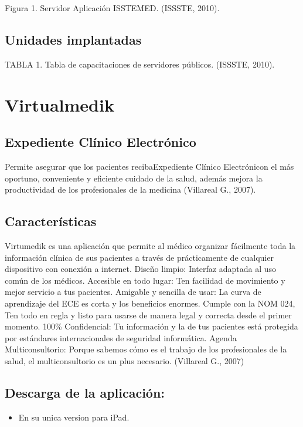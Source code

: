                              Figura 1. Servidor Aplicación ISSTEMED. (ISSSTE, 2010).




 \subsection{Unidades implantadas}

TABLA 1. Tabla de capacitaciones de servidores públicos. (ISSSTE, 2010).



\section{Virtualmedik}

\subsection{Expediente Clínico Electrónico}
Permite asegurar que los pacientes recibaExpediente Clínico Electrónicon el más oportuno, conveniente y eficiente cuidado de la salud, además mejora la productividad de los profesionales de la medicina (Villareal G., 2007).

\subsection{Características}
Virtumedik es una aplicación que permite al médico organizar fácilmente toda la información clínica de sus pacientes a través de prácticamente de cualquier dispositivo con conexión a internet.
Diseño limpio: Interfaz adaptada al uso común de los médicos.
Accesible en todo lugar: Ten facilidad de movimiento y mejor servicio a tus pacientes.
Amigable y sencilla de usar: La curva de aprendizaje del ECE es corta y los beneficios enormes.
Cumple con la NOM 024, Ten todo en regla y listo para usarse de manera legal y correcta desde el primer momento.
100\% Confidencial: Tu información y la de tus pacientes está protegida por estándares internacionales de seguridad informática.
Agenda Multiconsultorio: Porque sabemos cómo es el trabajo de los profesionales de la salud, el multiconsultorio es un plus necesario. (Villareal G., 2007)
\subsection{Descarga de la aplicación:}
\begin{itemize}
  \item En su unica version para iPad.
\end{itemize}



